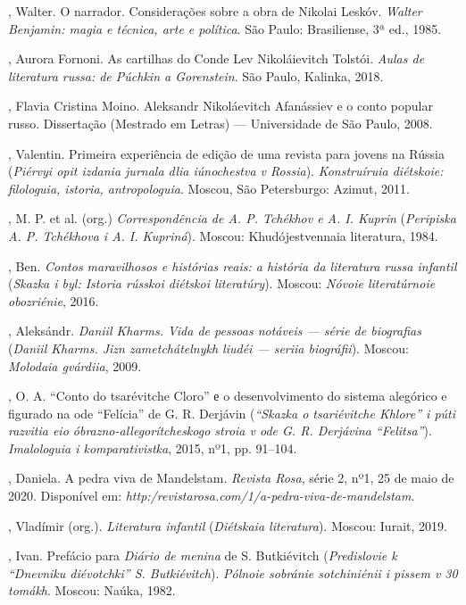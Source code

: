 \begin{bibliohedra}

, Walter. O narrador. Considerações sobre a obra de Nikolai Leskóv. \textit{Walter Benjamin: magia e técnica, arte e política}. São Paulo: Brasiliense, 3ª ed., 1985.

, Aurora Fornoni. As cartilhas do Conde Lev Nikoláievitch Tolstói. \textit{Aulas de literatura russa: de Púchkin a Gorenstein}. São Paulo, Kalinka, 2018.

, Flavia Cristina Moino. Aleksandr Nikoláevitch Afanássiev e o conto popular russo. Dissertação (Mestrado em Letras) — Universidade de São Paulo, 2008.

, Valentin. Primeira experiência de edição de uma revista para jovens na Rússia (\textit{Piérvyi opit izdania jurnala dlia iúnochestva v Rossia}). \textit{Konstruíruia diétskoie: filologuia, istoria, antropologuia}. Moscou, São Petersburgo: Azimut, 2011.

, M. P. et al. (org.) \textit{Correspondência de A. P. Tchékhov e A. I. Kuprin} (\textit{Peripiska A. P. Tchékhova i A. I. Kupriná}). Moscou: Khudójestvennaia literatura, 1984.

, Ben. \textit{Contos maravilhosos e histórias reais: a história da literatura russa infantil} (\textit{Skazka i byl: Istoria rússkoi diétskoi literatúry}). Moscou: \textit{Nóvoie literatúrnoie obozriénie}, 2016.

, Aleksándr. \textit{Daniil Kharms. Vida de pessoas notáveis — série de biografias} (\textit{Daniil Kharms. Jizn zametchátelnykh liudéi — seriia biográfii}). Moscou: \textit{Molodaia gvárdiia}, 2009.

, O. A. “Conto do tsarévitche Cloro” е o desenvolvimento do sistema alegórico e figurado na ode “Felícia” de G. R. Derjávin (\textit{“Skazka o tsariévitche Khlore” i púti razvitia eio óbrazno-allegorítcheskogo stroia v ode G. R. Derjávina “Felitsa”}). \textit{Imalologuia i komparativistka}, 2015, nº1, pp. 91–104.

, Daniela. A pedra viva de Mandelstam. \textit{Revista Rosa}, série 2, nº1, 25 de maio de 2020. Disponível em: \textit{http:/revistarosa.com/1/a-pedra-viva-de-mandelstam}.

, Vladímir (org.). \textit{Literatura infantil} (\textit{Diétskaia literatura}). Moscou: Iurait, 2019.

, Ivan. Prefácio para \textit{Diário de menina} de S. Butkiévitch (\textit{Predislovie k “Dnevniku diévotchki” S. Butkiévitch}). \textit{Pólnoie sobránie sotchiniénii i pissem v 30 tomákh}. Moscou: Naúka, 1982.


\end{bibliohedra}
